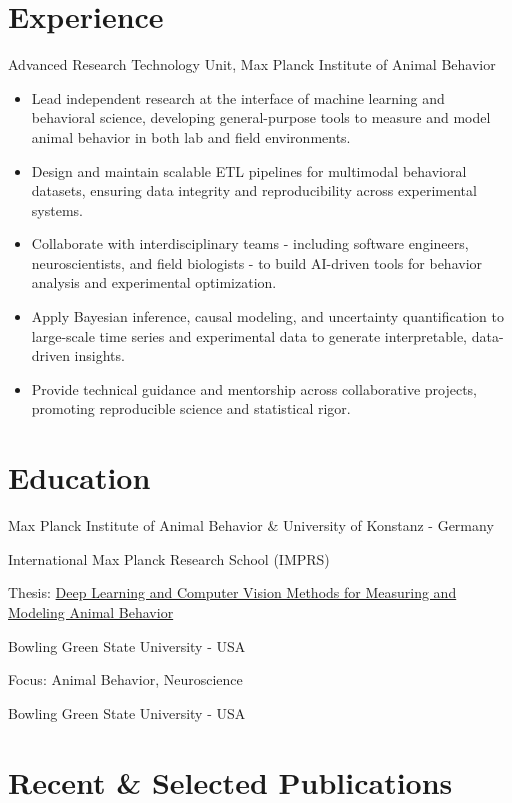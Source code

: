 \documentclass[10pt,a4paper]{article}
\begin{document}
\section*{Experience}
Advanced Research Technology Unit, Max Planck Institute of Animal Behavior\par
\begin{itemize}
\item Lead independent research at the interface of machine learning and behavioral science, developing general-purpose tools to measure and model animal behavior in both lab and field environments.
\item Design and maintain scalable ETL pipelines for multimodal behavioral datasets, ensuring data integrity and reproducibility across experimental systems.
\item Collaborate with interdisciplinary teams - including software engineers, neuroscientists, and field biologists - to build AI-driven tools for behavior analysis and experimental optimization.
\item Apply Bayesian inference, causal modeling, and uncertainty quantification to large-scale time series and experimental data to generate interpretable, data-driven insights.
\item Provide technical guidance and mentorship across collaborative projects, promoting reproducible science and statistical rigor.
\end{itemize}
\section*{Education}
Max Planck Institute of Animal Behavior \& University of Konstanz  -  Germany\par
International Max Planck Research School (IMPRS)\par
Thesis: \href{http://nbn-resolving.de/urn:nbn:de:bsz:352-2-dgcbudqch6ix8}{Deep Learning and Computer Vision Methods for Measuring and Modeling Animal Behavior}\par
{}
Bowling Green State University  -  USA\par
Focus: Animal Behavior, Neuroscience\par
{}
Bowling Green State University  -  USA\par
\newpage
\section*{Recent \& Selected Publications}
\end{document}

